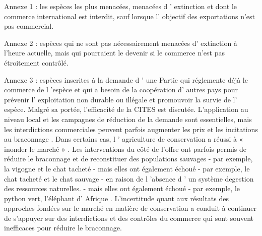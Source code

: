 \begin{displayquote}
\begin{displayquote}
\begin{displayquote}
{{Annexe 1 : les espèces les plus menacées, menacées d ' extinction et dont le commerce international est interdit, sauf lorsque l' objectif des exportations n'est pas commercial.

Annexe 2 : espèces qui ne sont pas nécessairement menacées d' extinction à l'heure actuelle, mais qui pourraient le devenir si le commerce n'est pas étroitement contrôlé.

Annexe 3 : espèces inscrites à la demande d ' une Partie qui réglemente déjà le commerce de l 'espèce et qui a besoin de la coopération d' autres pays pour prévenir l' exploitation non durable ou illégale et promouvoir la survie de l' espèce.   Malgré sa portée, l'efficacité de la CITES est discutée. L'application au niveau local \citep{HEID2023102784} et les campagnes de réduction de la demande \citep{macfarlane_reducing_2022, moorhouse_demand_2024} sont essentielles, mais les interdictions commerciales peuvent parfois augmenter les prix et les incitations au braconnage \citep{hsiang_does_2016}. Dans certains cas, l ' agriculture de conservation a réussi à « inonder le marché » \citep{gentry_looking_2019, phelps_framework_2014, tensen_under_2016}. Les interventions du côté de l'offre ont parfois permis de réduire le braconnage et de reconstituer des populations sauvages - par exemple, la vigogne et le chat tacheté \citep{iucn_world_2000, sahley_biological_2007}- mais elles ont également échoué - par exemple, le chat tacheté et le chat sauvage - en raison de l 'absence d ' un système degestion des ressources naturelles. - mais elles ont également échoué - par exemple, le python vert, l'éléphant d' Afrique \citep{lyons_wildlife_2011, hsiang_does_2016}.   L'incertitude quant aux résultats des approches fondées sur le marché en matière de conservation a conduit à continuer de s'appuyer sur des interdictions et des contrôles du commerce qui sont souvent inefficaces pour réduire le braconnage.



}}
\end{displayquote}
\end{displayquote}
\end{displayquote}
